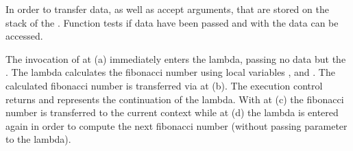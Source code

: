 In order to transfer data, \call as well as \resume accept arguments, that are
stored on the stack of the \currcont. Function \davail tests if data have been
passed and with \dget the data can be accessed.

The invocation of \call at (a) immediately enters the lambda, passing no data
but the \currcont. The lambda calculates the fibonacci number using local
variables ,  and . The calculated fibonacci number is
transferred via \resume at (b). The execution control returns and 
represents the continuation of the lambda. With \dget at (c) the fibonacci
number is transferred to the current context while at (d) the lambda is entered
again in order to compute the next fibonacci number (without passing parameter
to the lambda).
